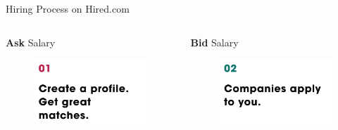 \begin{frame}{Hiring Process on Hired.com}
    \begin{columns}[T]
        \begin{column}{0.3\textwidth}
            \begin{block}{\small \centering \textbf{Ask} Salary}
                \begin{figure}
                    \centering
                    \includegraphics[width = 0.95 \textwidth]{images/hireprocess1.png}
                \end{figure}
            \end{block}
        \end{column}

        \begin{column}{0.3\textwidth}
            \begin{block}{\small \centering \textbf{Bid} Salary}
                \begin{figure}
                    \centering
                    \includegraphics[width = 0.95 \textwidth]{images/hireprocess2.png}
                \end{figure}
            \end{block}
        \end{column}


\end{columns}
\end{frame}
